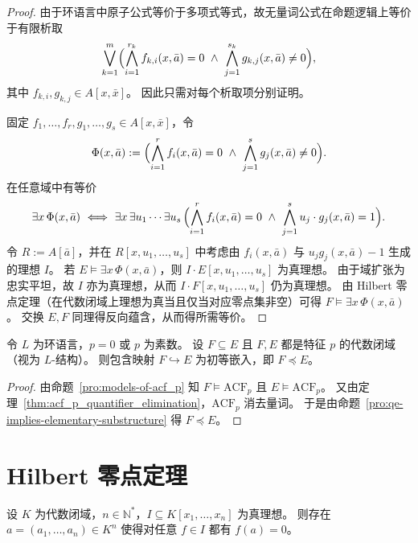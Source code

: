 \documentclass[lang=cn,a4paper,newtx,section]{elegantbook}
\begin{document}
\begin{proof}
由于环语言中原子公式等价于多项式等式，故无量词公式在命题逻辑上等价于有限析取
\[
  \bigvee_{k=1}^m\Bigl(\bigwedge_{i=1}^{r_k} f_{k,i}(x,\bar a)=0\ \wedge\ \bigwedge_{j=1}^{s_k} g_{k,j}(x,\bar a)\neq 0\Bigr),
\]
其中 $f_{k,i},g_{k,j}\in A[x,\bar x]$。
因此只需对每个析取项分别证明。

固定 $f_1,\dots,f_r,g_1,\dots,g_s\in A[x,\bar x]$，令
\[
  \Phi(x,\bar a):=\Bigl(\bigwedge_{i=1}^{r} f_i(x,\bar a)=0\ \wedge\ \bigwedge_{j=1}^{s} g_j(x,\bar a)\neq 0\Bigr).
\]
在任意域中有等价
\[
  \exists x\,\Phi(x,\bar a)\ \Longleftrightarrow\ \exists x\,\exists u_1\cdots\exists u_s\,\Bigl(\bigwedge_{i=1}^{r} f_i(x,\bar a)=0\ \wedge\ \bigwedge_{j=1}^{s} u_j\cdot g_j(x,\bar a)=1\Bigr).
\]
令 $R:=A[\bar a]$，并在 $R[x,u_1,\dots,u_s]$ 中考虑由 $f_i(x,\bar a)$ 与 $u_jg_j(x,\bar a)-1$ 生成的理想 $I$。
若 $E\models\exists x\,\Phi(x,\bar a)$，则 $I\cdot E[x,u_1,\dots,u_s]$ 为真理想。
由于域扩张为忠实平坦，故 $I$ 亦为真理想，从而 $I\cdot F[x,u_1,\dots,u_s]$ 仍为真理想。
由 Hilbert 零点定理（在代数闭域上理想为真当且仅当对应零点集非空）可得 $F\models\exists x\,\Phi(x,\bar a)$。
交换 $E,F$ 同理得反向蕴含，从而得所需等价。
\end{proof}

\begin{corollary}
\label{acf_p_elementary_extension}
令 $L$ 为环语言，$p=0$ 或 $p$ 为素数。
设 $F\subseteq E$ 且 $F,E$ 都是特征 $p$ 的代数闭域（视为 $L$-结构）。
则包含映射 $F\hookrightarrow E$ 为初等嵌入，即 $F\preccurlyeq E$。
\end{corollary}

\begin{proof}
由命题~\ref{pro:models-of-acf_p} 知 $F\models\mathrm{ACF}_p$ 且 $E\models\mathrm{ACF}_p$。
又由定理~\ref{thm:acf_p_quantifier_elimination}，$\mathrm{ACF}_p$ 消去量词。
于是由命题~\ref{pro:qe-implies-elementary-substructure} 得 $F\preccurlyeq E$。
\end{proof}

\section{Hilbert 零点定理}

\begin{theorem}
\label{hilbert-nullstellensatz-weak}
设 $K$ 为代数闭域，$n\in\mathbb N^*$，$I\subseteq K[x_1,\dots,x_n]$ 为真理想。
则存在 $a=(a_1,\dots,a_n)\in K^n$ 使得对任意 $f\in I$ 都有 $f(a)=0$。
\end{theorem}
\end{document}
